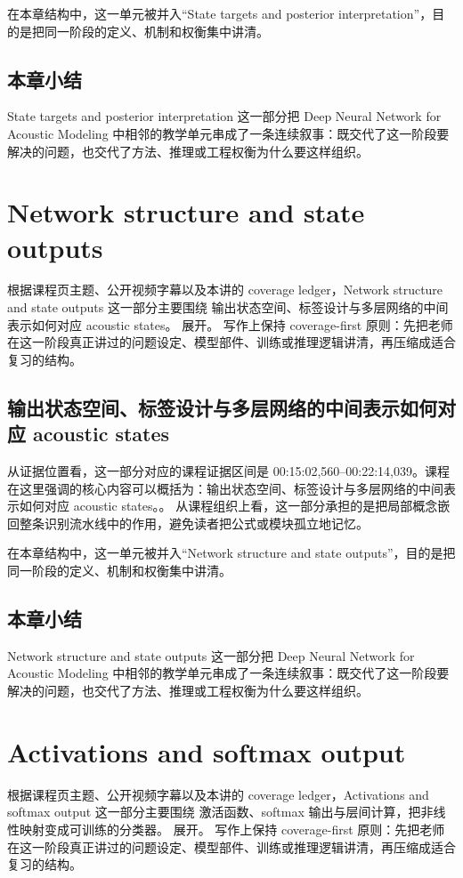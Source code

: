 \documentclass[a4paper]{article}
\begin{document}
在本章结构中，这一单元被并入“State targets and posterior interpretation”，目的是把同一阶段的定义、机制和权衡集中讲清。

\subsection{本章小结}
State targets and posterior interpretation 这一部分把 Deep Neural Network for Acoustic Modeling 中相邻的教学单元串成了一条连续叙事：既交代了这一阶段要解决的问题，也交代了方法、推理或工程权衡为什么要这样组织。

\section{Network structure and state outputs}
根据课程页主题、公开视频字幕以及本讲的 coverage ledger，Network structure and state outputs 这一部分主要围绕 输出状态空间、标签设计与多层网络的中间表示如何对应 acoustic states。 展开。
写作上保持 coverage-first 原则：先把老师在这一阶段真正讲过的问题设定、模型部件、训练或推理逻辑讲清，再压缩成适合复习的结构。

\subsection{输出状态空间、标签设计与多层网络的中间表示如何对应 acoustic states}
从证据位置看，这一部分对应的课程证据区间是 00:15:02,560--00:22:14,039。课程在这里强调的核心内容可以概括为：输出状态空间、标签设计与多层网络的中间表示如何对应 acoustic states。。
从课程组织上看，这一部分承担的是把局部概念嵌回整条识别流水线中的作用，避免读者把公式或模块孤立地记忆。

在本章结构中，这一单元被并入“Network structure and state outputs”，目的是把同一阶段的定义、机制和权衡集中讲清。

\subsection{本章小结}
Network structure and state outputs 这一部分把 Deep Neural Network for Acoustic Modeling 中相邻的教学单元串成了一条连续叙事：既交代了这一阶段要解决的问题，也交代了方法、推理或工程权衡为什么要这样组织。

\section{Activations and softmax output}
根据课程页主题、公开视频字幕以及本讲的 coverage ledger，Activations and softmax output 这一部分主要围绕 激活函数、softmax 输出与层间计算，把非线性映射变成可训练的分类器。 展开。
写作上保持 coverage-first 原则：先把老师在这一阶段真正讲过的问题设定、模型部件、训练或推理逻辑讲清，再压缩成适合复习的结构。
\end{document}
